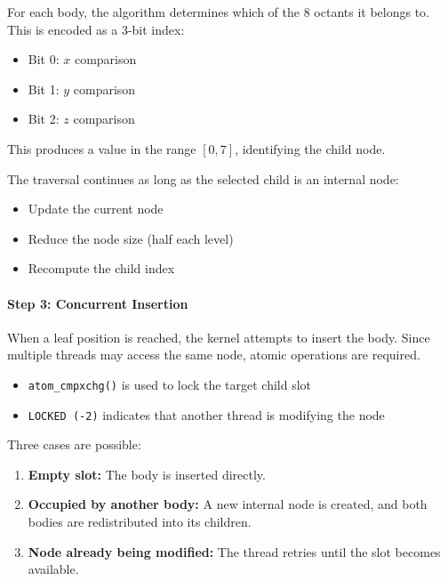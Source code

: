 \documentclass[12pt]{article}
\begin{document}
For each body, the algorithm determines which of the 8 octants it belongs to.
This is encoded as a 3-bit index:

\begin{itemize}
    \item Bit 0: $x$ comparison
    \item Bit 1: $y$ comparison
    \item Bit 2: $z$ comparison
\end{itemize}

This produces a value in the range $[0,7]$, identifying the child node.

The traversal continues as long as the selected child is an internal node:
\begin{itemize}
    \item Update the current node
    \item Reduce the node size (half each level)
    \item Recompute the child index
\end{itemize}

\paragraph{Step 3: Concurrent Insertion}

When a leaf position is reached, the kernel attempts to insert the body.
Since multiple threads may access the same node, atomic operations are required.

\begin{itemize}
    \item \texttt{atom\_cmpxchg()} is used to lock the target child slot
    \item \texttt{LOCKED (-2)} indicates that another thread is modifying the node
\end{itemize}

Three cases are possible:

\begin{enumerate}
    \item \textbf{Empty slot:}  
    The body is inserted directly.

    \item \textbf{Occupied by another body:}  
    A new internal node is created, and both bodies are redistributed
    into its children.

    \item \textbf{Node already being modified:}  
    The thread retries until the slot becomes available.
\end{enumerate}
\end{document}
